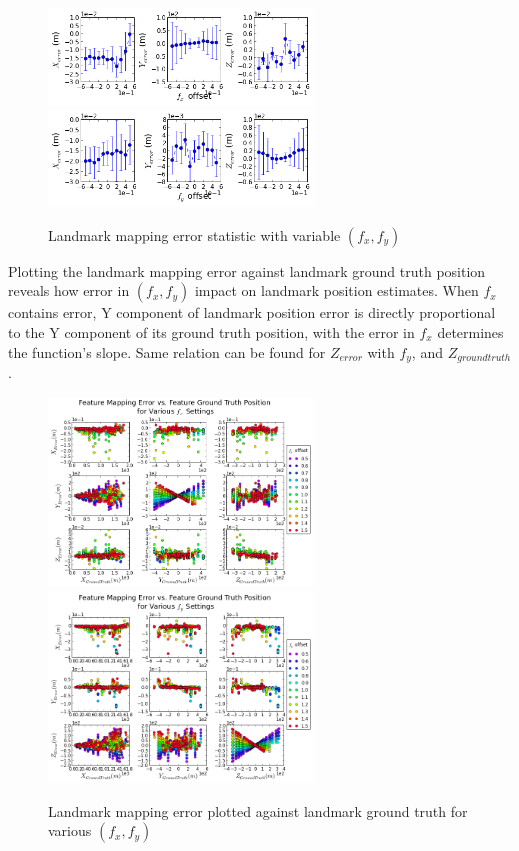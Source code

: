 \begin{figure}[h]
  \centering
  \includegraphics[width=7cm,keepaspectratio=true]{./Figures/SimulationFigures/Figure38.png}
  \includegraphics[width=7cm,keepaspectratio=true]{./Figures/SimulationFigures/Figure39.png}
  \caption{Landmark mapping error statistic with variable $(f_x, f_y)$}
  \label{fig:simfig38-39}
\end{figure}

Plotting the landmark mapping error against landmark ground truth position reveals how error in $(f_x, f_y)$ impact on landmark position estimates. When $f_x$ contains error, Y component of landmark position error is directly proportional to the Y component of its ground truth position, with the error in $f_x$ determines the function's slope. Same relation can be found for $Z_{error}$ with $f_y$, and $Z_{ground truth}$.

\begin{figure}[h]
  \centering
  \includegraphics[width=7cm,keepaspectratio=true]{./Figures/SimulationFigures/Figure41.png}
  \includegraphics[width=7cm,keepaspectratio=true]{./Figures/SimulationFigures/Figure42.png}
  \caption{Landmark mapping error plotted against landmark ground truth
    for various $(f_x, f_y)$}
  \label{fig:simfig38-39}
\end{figure}

